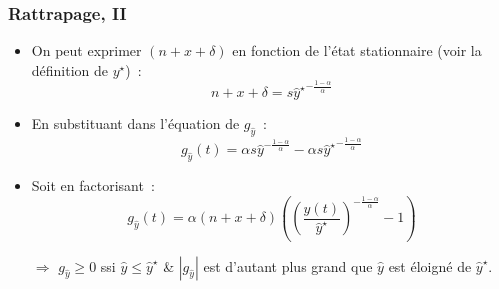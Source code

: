 \documentclass[10pt,notheorems]{beamer}
\theoremstyle{plain}
\theoremstyle{definition} %
\begin{document}
\begin{frame}
  \frametitle{Rattrapage, II}

  \begin{itemize}

  \item On peut exprimer $(n+x+\delta)$ en fonction de l'état stationnaire (voir la définition de $y^\star$)~:
    \[
      n+x+\delta = s \left.\hat y^{\star}\right.^{-\frac{1-\alpha}{\alpha}}
    \]

  \item En substituant dans l'équation de $g_{\hat y}$~:
    \[
      g_{\hat y}(t) = \alpha s  \hat y^{-\frac{1-\alpha}{\alpha}} - \alpha s \left.\hat y^{\star}\right.^{-\frac{1-\alpha}{\alpha}}
    \]

  \item Soit en factorisant~:
    \[
      g_{\hat y}(t) = \alpha (n+x+\delta)\left(\left(\frac{\hat y(t)}{\hat y^{\star}}\right)^{-\frac{1-\alpha}{\alpha}}-1\right)
    \]

  \item[$\Rightarrow$] $g_{\hat y}\geq 0$ ssi $\hat y\leq \left.\hat y^{\star}\right.$ \& $|g_{\hat y}|$ est d'autant plus grand que $\hat y$ est éloigné de $\hat y^\star$.

  \end{itemize}

\end{frame}
\end{document}
